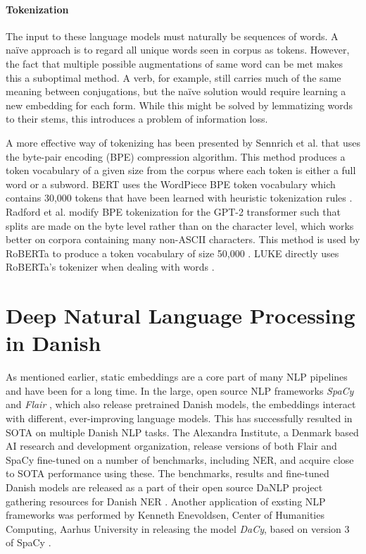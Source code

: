 \documentclass[main.tex]{subfiles}
\begin{document}
\paragraph{Tokenization}
The input to these language models must naturally be sequences of words.
A naïve approach is to regard all unique words seen in corpus as tokens.
However, the fact that multiple possible augmentations of same word can be met makes this a suboptimal method.
A verb, for example, still carries much of the same meaning between conjugations, but the naïve solution would require learning a new embedding for each form.
While this might be solved by lemmatizing words to their stems, this introduces a problem of information loss.

A more effective way of tokenizing has been presented by Sennrich et al. \cite{sennrich-etal-2016-neural} that uses the byte-pair encoding (BPE) compression algorithm.
This method produces a token vocabulary of a given size from the corpus where each token is either a full word or a subword.
BERT uses the WordPiece BPE token vocabulary which contains 30,000 tokens that have been learned with heuristic tokenization rules \cite{wu2016tokenize} \cite{devlin2019bert}.
Radford et al. \cite{Radford2019gpt2} modify BPE tokenization for the GPT-2 transformer such that splits are made on the byte level rather than on the character level, which works better on corpora containing many non-ASCII characters.
This method is used by RoBERTa to produce a token vocabulary of size 50,000 \cite{liu2019roberta}.
LUKE directly uses RoBERTa's tokenizer when dealing with words \cite{yamada2020luke}.

\section{Deep Natural Language Processing in Danish}
\label{sec:nlpda}
As mentioned earlier, static embeddings are a core part of many NLP pipelines and have been for a long time.
In the large, open source NLP frameworks \emph{SpaCy} \cite{honnibal2020spacy} and \emph{Flair} \cite{akbik2019flair}, which also release pretrained Danish models, the embeddings interact with different, ever-improving language models.
This has successfully resulted in SOTA on multiple Danish NLP tasks.
The Alexandra Institute, a Denmark based AI research and development organization, release versions of both Flair and SpaCy fine-tuned on a number of benchmarks, including NER, and acquire close to SOTA performance using these.
The benchmarks, results and fine-tuned Danish models are released as a part of their open source DaNLP project gathering resources for Danish NER \cite{danlp2021}.
Another application of exsting NLP frameworks was performed by Kenneth Enevoldsen, Center of Humanities Computing, Aarhus University in releasing the model \emph{DaCy}, based on version 3 of SpaCy \cite{enevoldsen2020dacy}.
\end{document}
